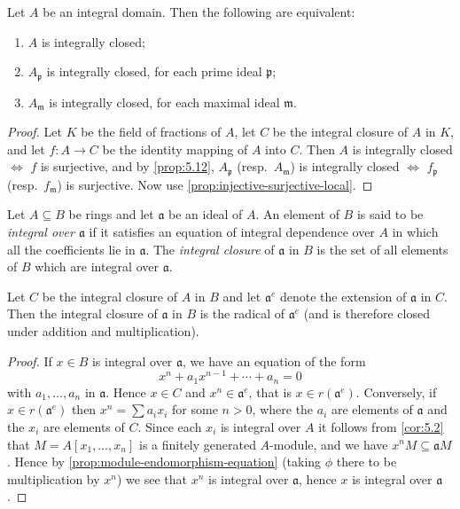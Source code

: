\begin{proposition}\label{prop:5.13}
Let $A$ be an integral domain. Then the following are equivalent:
\begin{enumerate}
    \item[i)] $A$ is integrally closed;
    \item[ii)] $A_{\mathfrak{p}}$ is integrally closed, for each prime ideal $\mathfrak{p}$;
    \item[iii)] $A_{\mathfrak{m}}$ is integrally closed, for each maximal ideal $\mathfrak{m}$.
\end{enumerate}
\end{proposition}
\begin{proof}
    Let $K$ be the field of fractions of $A$, let $C$ be the integral closure of $A$ in $K$, and let $f \colon A \to C$ be the identity mapping of $A$ into $C$. Then $A$ is integrally closed $\iff$ $f$ is surjective, and by \eqref{prop:5.12}, $A_{\mathfrak{p}}$ (resp.~$A_{\mathfrak{m}}$) is integrally closed $\iff$ $f_{\mathfrak{p}}$ (resp.~$f_{\mathfrak{m}}$) is surjective. Now use \eqref{prop:injective-surjective-local}.
\end{proof}

Let $A \subseteq B$ be rings and let $\mathfrak{a}$ be an ideal of $A$. An element of $B$ is said to be \emph{integral over $\mathfrak{a}$} if it satisfies an equation of integral dependence over $A$ in which all the coefficients lie in $\mathfrak{a}$. The \emph{integral closure} of $\mathfrak{a}$ in $B$ is the set of all elements of $B$ which are integral over $\mathfrak{a}$.

\begin{lemma}\label{lem:5.14}
Let $C$ be the integral closure of $A$ in $B$ and let $\mathfrak{a}^e$ denote the extension of $\mathfrak{a}$ in $C$. Then the integral closure of $\mathfrak{a}$ in $B$ is the radical of $\mathfrak{a}^e$ (and is therefore closed under addition and multiplication).
\end{lemma}

\begin{proof}
If $x \in B$ is integral over $\mathfrak{a}$, we have an equation of the form
\[
x^n + a_1 x^{n-1} + \cdots + a_n = 0
\]
with $a_1, \ldots, a_n$ in $\mathfrak{a}$. Hence $x \in C$ and $x^n \in \mathfrak{a}^e$, that is $x \in r(\mathfrak{a}^e)$. Conversely, if $x \in r(\mathfrak{a}^e)$ then $x^n = \sum a_i x_i$ for some $n > 0$, where the $a_i$ are elements of $\mathfrak{a}$ and the $x_i$ are elements of $C$. Since each $x_i$ is integral over $A$ it follows from \eqref{cor:5.2} that $M = A[x_1, \ldots, x_n]$ is a finitely generated $A$-module, and we have $x^n M \subseteq \mathfrak{a} M$. Hence by \eqref{prop:module-endomorphism-equation} (taking $\phi$ there to be multiplication by $x^n$) we see that $x^n$ is integral over $\mathfrak{a}$, hence $x$ is integral over $\mathfrak{a}$.
\end{proof}

